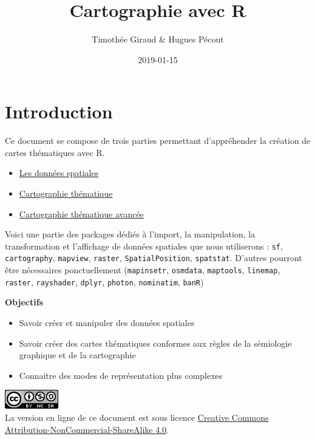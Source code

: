 \documentclass[]{book}
\title{Cartographie avec R}
\author{Timothée Giraud \& Hugues Pécout}
\date{2019-01-15}
\providecommand{\tightlist}{%
  \setlength{\itemsep}{0pt}\setlength{\parskip}{0pt}}
\begin{document}
\maketitle

{
\setcounter{tocdepth}{1}
\tableofcontents
}
\chapter*{Introduction}\label{introduction}

Ce document se compose de trois parties permettant d'appréhender la
création de cartes thématiques avec R.

\begin{itemize}
\tightlist
\item
  \protect\hyperlink{chapitre1}{Les données spatiales}
\item
  \protect\hyperlink{chapitre2}{Cartographie thématique}\\
\item
  \protect\hyperlink{chapitre3}{Cartographie thématique avancée}
\end{itemize}

Voici une partie des packages dédiés à l'import, la manipulation, la
transformation et l'affichage de données spatiales que nous utiliserons
: \texttt{sf}, \texttt{cartography}, \texttt{mapview}, \texttt{raster},
\texttt{SpatialPosition}, \texttt{spatstat}. D'autres pourront être
nécessaires ponctuellement (\texttt{mapinsetr}, \texttt{osmdata},
\texttt{maptools}, \texttt{linemap}, \texttt{raster},
\texttt{rayshader}, \texttt{dplyr}, \texttt{photon}, \texttt{nominatim},
\texttt{banR})

\textbf{Objectifs}

\begin{itemize}
\tightlist
\item
  Savoir créer et manipuler des données spatiales
\item
  Savoir créer des cartes thématiques conformes aux règles de la
  sémiologie graphique et de la cartographie
\item
  Connaitre des modes de représentation plus complexes
\end{itemize}

 \includegraphics{img/by-nc-sa.png}\\
La version en ligne de ce document est sous licence
\href{http://creativecommons.org/licenses/by-nc-sa/4.0/}{Creative
Commons Attribution-NonCommercial-ShareAlike 4.0}.
\end{document}
